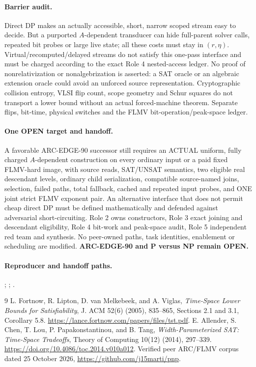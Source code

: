 \documentclass[11pt]{article}
\begin{document}
\paragraph{Barrier audit.}
Direct DP makes an actually accessible, short, narrow scoped
stream easy to decide. But a purported $A$-dependent transducer
can hide full-parent solver calls, repeated bit probes or large
live state; all these costs must stay in $(r,\eta)$.
Virtual/recomputed/delayed streams do not satisfy this one-pass
interface and must be charged according to the exact Role 4
nested-access ledger. No proof of nonrelativization or
nonalgebrization is asserted: a SAT oracle or an algebraic extension
oracle could avoid an unforced source representation. Cryptographic
collision entropy, VLSI flip count, scope geometry and Schur squares
do not transport a lower bound without an actual forced-machine
theorem. Separate flips, bit-time, physical switches and the FLMV
bit-operation/peak-space ledger.

\paragraph{One OPEN target and handoff.}
A favorable ARC-EDGE-90 successor still requires an ACTUAL uniform,
fully charged $A$-dependent construction on every ordinary input
or a paid fixed FLMV-hard image, with source reads, SAT/UNSAT
semantics, two eligible real descendant levels, ordinary child
serialization, compatible source-named joins, selection, failed
paths, total fallback, cached and repeated input probes, and ONE
joint strict FLMV exponent pair. An alternative interface that
does not permit cheap direct DP must be defined mathematically
and defended against adversarial short-circuiting.
Role 2 owns constructors, Role 3 exact joining and descendant
eligibility, Role 4 bit-work and peak-space audit, Role 5
independent red team and synthesis. No peer-owned paths, task
identities, enablement or scheduling are modified.
\textbf{ARC-EDGE-90 and P versus NP remain OPEN.}

\paragraph{Reproducer and handoff paths.}
;
;
.

\begin{thebibliography}{9}
 L. Fortnow, R. Lipton, D. van Melkebeek, and A. Viglas,
\emph{Time-Space Lower Bounds for Satisfiability}, J. ACM 52(6)
(2005), 835--865, Sections 2.1 and 3.1, Corollary 5.8.
\url{https://lance.fortnow.com/papers/files/tst.pdf}.
 E. Allender, S. Chen, T. Lou, P. Papakonstantinou,
and B. Tang, \emph{Width-Parameterized SAT: Time-Space Tradeoffs},
Theory of Computing 10(12) (2014), 297--339.
\url{https://doi.org/10.4086/toc.2014.v010a012}.
 Verified peer ARC/FLMV corpus dated 25 October 2026,
\url{https://github.com/j15marti/pnp}.
\end{thebibliography}
\end{document}
